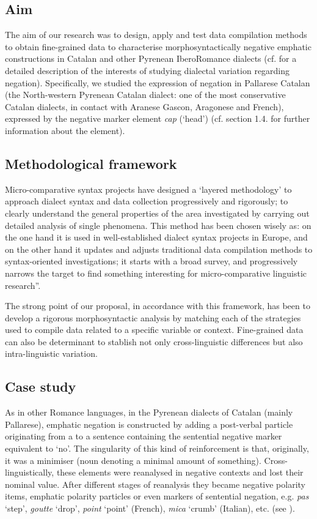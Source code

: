 \documentclass[output=paper]{LSP/langsci}
\begin{document}
\subsection{Aim}
The aim of our research was to design, apply and test data compilation methods to obtain fine-grained data to characterise morphosyntactically negative emphatic constructions in Catalan and other Pyrenean IberoRomance dialects (cf. \citealt{berns_present-day_2002} for a detailed description of the interests of studying dialectal variation regarding negation).  Specifically, we studied the expression of negation in Pallarese Catalan (the North-western Pyrenean Catalan dialect: one of the most conservative Catalan dialects, in contact with Aranese Gascon, Aragonese and French), expressed by the negative marker element \textit{cap} (‘head’) (cf. section 1.4. for further information about the element). 

\subsection{Methodological framework}
Micro-comparative syntax projects have designed a ‘layered methodology’ \citep{cornips_field_2007} to approach dialect syntax and data collection progressively and rigorously; to clearly understand the general properties of the area investigated by carrying out detailed analysis of single phenomena. This method has been chosen wisely as: on the one hand it is used in well-established dialect syntax projects in Europe, and on the other hand it updates and adjusts traditional data compilation methods to syntax-oriented investigations; it starts with a broad survey, and progressively narrows the target to find something interesting for micro-comparative linguistic research”.

The strong point of our proposal, in accordance with this framework, has been to develop a rigorous morphosyntactic analysis by matching each of the strategies used to compile data related to a specific variable or context. Fine-grained data can also be determinant to stablish not only cross-linguistic differences but also intra-linguistic variation. 

\subsection{Case study}
As in other Romance languages, in the Pyrenean dialects of Catalan (mainly Pallarese), emphatic negation is constructed by adding a post-verbal particle originating from a  to a sentence containing the sentential negative marker equivalent to ‘no’. The singularity of this kind of reinforcement is that, originally, it was a minimiser (noun denoting a minimal amount of something). Cross-linguistically, these elements were reanalysed in negative contexts and lost their nominal value. After different stages of reanalysis they became negative polarity items, emphatic polarity particles or even markers of sentential negation, e.g. \textit{pas} ‘step’,\textit{ goutte} ‘drop’, \textit{point} ‘point’ (French), \textit{mica} ‘crumb’ (Italian), etc. (see \citealt{schwegler_word-order_1988,detges_grammaticalization_2002}). 
\end{document}
